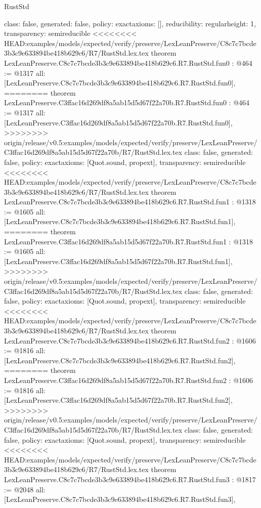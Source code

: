 \begin{lexlean}{RustStd}
\begin{coremodule}
{\begin{coremodule}
{{{  class: false,
  generated: false,
  policy: exact{axioms: []},
  reducibility: regular{height: 1},
  transparency: semireducible
}
<<<<<<<< HEAD:examples/models/expected/verify/preserve/LexLeanPreserve/C8c7c7bcde3b3c9e633894be418b629c6/R7/RustStd.lex.tex
theorem LexLeanPreserve.C8c7c7bcde3b3c9e633894be418b629c6.R7.RustStd.fun0 : @464 := @1317 {
  all: [LexLeanPreserve.C8c7c7bcde3b3c9e633894be418b629c6.R7.RustStd.fun0],
========
theorem LexLeanPreserve.C3ffac16d269df8a5ab15d5d67f22a70b.R7.RustStd.fun0 : @464 := @1317 {
  all: [LexLeanPreserve.C3ffac16d269df8a5ab15d5d67f22a70b.R7.RustStd.fun0],
>>>>>>>> origin/release/v0.5:examples/models/expected/verify/preserve/LexLeanPreserve/C3ffac16d269df8a5ab15d5d67f22a70b/R7/RustStd.lex.tex
  class: false,
  generated: false,
  policy: exact{axioms: [Quot.sound, propext]},
  transparency: semireducible
}
<<<<<<<< HEAD:examples/models/expected/verify/preserve/LexLeanPreserve/C8c7c7bcde3b3c9e633894be418b629c6/R7/RustStd.lex.tex
theorem LexLeanPreserve.C8c7c7bcde3b3c9e633894be418b629c6.R7.RustStd.fun1 : @1318 := @1605 {
  all: [LexLeanPreserve.C8c7c7bcde3b3c9e633894be418b629c6.R7.RustStd.fun1],
========
theorem LexLeanPreserve.C3ffac16d269df8a5ab15d5d67f22a70b.R7.RustStd.fun1 : @1318 := @1605 {
  all: [LexLeanPreserve.C3ffac16d269df8a5ab15d5d67f22a70b.R7.RustStd.fun1],
>>>>>>>> origin/release/v0.5:examples/models/expected/verify/preserve/LexLeanPreserve/C3ffac16d269df8a5ab15d5d67f22a70b/R7/RustStd.lex.tex
  class: false,
  generated: false,
  policy: exact{axioms: [Quot.sound, propext]},
  transparency: semireducible
}
<<<<<<<< HEAD:examples/models/expected/verify/preserve/LexLeanPreserve/C8c7c7bcde3b3c9e633894be418b629c6/R7/RustStd.lex.tex
theorem LexLeanPreserve.C8c7c7bcde3b3c9e633894be418b629c6.R7.RustStd.fun2 : @1606 := @1816 {
  all: [LexLeanPreserve.C8c7c7bcde3b3c9e633894be418b629c6.R7.RustStd.fun2],
========
theorem LexLeanPreserve.C3ffac16d269df8a5ab15d5d67f22a70b.R7.RustStd.fun2 : @1606 := @1816 {
  all: [LexLeanPreserve.C3ffac16d269df8a5ab15d5d67f22a70b.R7.RustStd.fun2],
>>>>>>>> origin/release/v0.5:examples/models/expected/verify/preserve/LexLeanPreserve/C3ffac16d269df8a5ab15d5d67f22a70b/R7/RustStd.lex.tex
  class: false,
  generated: false,
  policy: exact{axioms: [Quot.sound, propext]},
  transparency: semireducible
}
<<<<<<<< HEAD:examples/models/expected/verify/preserve/LexLeanPreserve/C8c7c7bcde3b3c9e633894be418b629c6/R7/RustStd.lex.tex
theorem LexLeanPreserve.C8c7c7bcde3b3c9e633894be418b629c6.R7.RustStd.fun3 : @1817 := @2048 {
  all: [LexLeanPreserve.C8c7c7bcde3b3c9e633894be418b629c6.R7.RustStd.fun3],
}}}}}}
\end{coremodule}}
\end{coremodule}
\end{lexlean}
